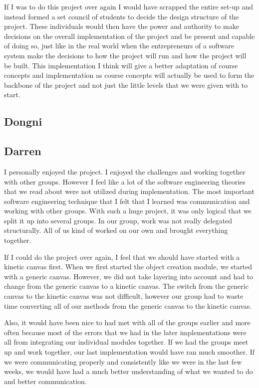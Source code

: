 \documentclass[a4paper, 11pt]{article} %
\begin{document}
If I was to do this project over again I would have scrapped the entire set-up and instead formed a set council of students to decide the design structure of the project. These individuals would then have the power and authority to make decisions on the overall implementation of the project and be present and capable of doing so, just like in the real world when the entrepreneurs of a software system make the decisions to how the project will run and how the project will be built. This implementation I think will give a better adaptation of course concepts and implementation as course concepts will actually be used to form the backbone of the project and not just the little levels that we were given with to start. 


\subsection{Dongni}


\subsection{Darren}
I personally enjoyed the project. I enjoyed the challenges and working together with other groups. However I feel like a lot of the software engineering theories that we read about were not utilized during implementation. The most important software engineering technique that I felt that I learned was communication and working with other groups. With such a huge project, it was only logical that we split it up into several groups. In our group, work was not really delegated structurally. All of us kind of worked on our own and brought everything together. 

If I could do the project over again, I feel that we should have started with a kinetic canvas first. When we first started the object creation module, we started with a generic canvas. However, we did not take layering into account and had to change from the generic canvas to a kinetic canvas. The switch from the generic canvas to the kinetic canvas was not difficult, however our group had to waste time converting all of our methods from the generic canvas to the kinetic canvas.  

Also, it would have been nice to had met with all of the groups earlier and more often because most of the errors that we had in the later implementations were all from integrating our individual modules together. If we had the groups meet up and work together, our last implementation would have ran much smoother. If we were communicating properly and consistently like we were in the last few weeks, we would have had a much better understanding of what we wanted to do and better communication. 
\end{document}
